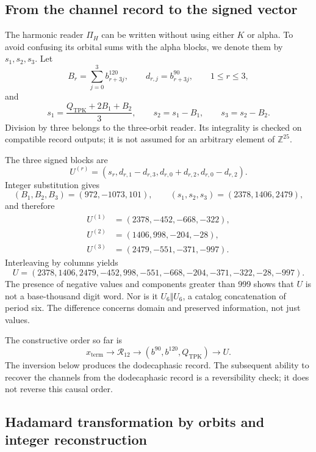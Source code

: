 \subsection{From the channel record to the signed vector}
\label{subsec:k-pi-h}

The harmonic reader \(\Pi_H\) can be written without using either \(K\) or
alpha. To avoid confusing its orbital sums with the alpha blocks,
we denote them by \(s_1,s_2,s_3\). Let
\[
 B_r=\sum_{j=0}^{3}b^{120}_{r+3j},\qquad
 d_{r,j}=b^{90}_{r+3j},\qquad1\leq r\leq3,
\]
and
\begin{equation}
 s_1=\frac{Q_{\mathrm{TPK}}+2B_1+B_2}{3},\qquad
 s_2=s_1-B_1,\qquad s_3=s_2-B_2.
 \label{eq:k-sumas-armonicas}
\end{equation}
Division by three belongs to the three-orbit reader. Its
integrality is checked on compatible record outputs; it is not
assumed for an arbitrary element of \(\mathbb Z^{25}\).

The three signed blocks are
\begin{equation}
 U^{(r)}=(s_r,d_{r,1}-d_{r,3},d_{r,0}+d_{r,2},d_{r,0}-d_{r,2}).
 \label{eq:k-bloques-firmados}
\end{equation}
Integer substitution gives
\[
 (B_1,B_2,B_3)=(972,-1073,101),\qquad
 (s_1,s_2,s_3)=(2378,1406,2479),
\]
and therefore
\begin{align*}
 U^{(1)}&=(2378,-452,-668,-322),\\
 U^{(2)}&=(1406,998,-204,-28),\\
 U^{(3)}&=(2479,-551,-371,-997).
\end{align*}
Interleaving by columns yields
\begin{equation}
 U=(2378,1406,2479,-452,998,-551,
       -668,-204,-371,-322,-28,-997).
 \label{eq:k-u-firmado}
\end{equation}
The presence of negative values and components greater than 999
shows that \(U\) is not a base-thousand digit word. Nor is it
\(U_6\Vert U_6\), a catalog concatenation of period six. The difference
concerns domain and preserved information, not just values.

The constructive order so far is
\[
 x_{\mathrm{term}}\longrightarrow\mathcal R_{12}
 \longrightarrow(b^{90},b^{120},Q_{\mathrm{TPK}})
 \longrightarrow U.
\]
The inversion below produces the dodecaphasic record. The subsequent ability to recover
the channels from the dodecaphasic record is a reversibility check; it does not
reverse this causal order.

\subsection{Hadamard transformation by orbits and integer reconstruction}
\label{subsec:k-hadamard}

